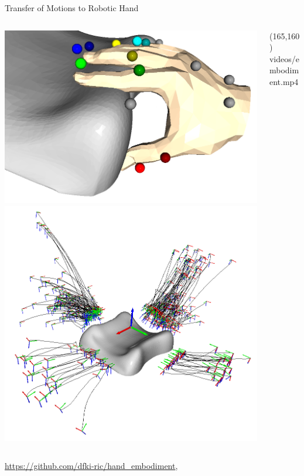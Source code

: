 \documentclass[14pt]{beamer}
\begin{document}
\begin{frame}[fragile]{Transfer of Motions to Robotic Hand}
\begin{columns}
\begin{column}{0.4\textwidth}
\includegraphics[width=\textwidth]{images/embodiment_record}
\includegraphics[width=\textwidth]{images/embodiment_dataset}
\end{column}
\begin{column}{0.6\textwidth}
\makebox(165,160){
{videos/embodiment.mp4}}%
\end{column}
\end{columns}
{\small \url{https://github.com/dfki-ric/hand_embodiment}, \parencite{Fabisch2022}}
\end{frame}
\end{document}

